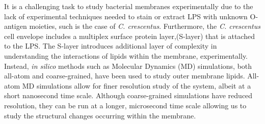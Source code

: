 \documentclass[10pt, letterpaper]{article}
\begin{document}
\par It is a challenging task to study bacterial membranes experimentally due to the lack of experimental techniques needed to stain or extract LPS with unknown O-antigen moieties, such is the case of \textit{C. crescentus}. Furthermore, the \textit{C. crescentus} cell envelope includes a multiplex surface protein layer,(S-layer) that is attached to the LPS. The S-layer introduces additional layer of complexity in understanding the interactions of lipids within the membrane, experimentally. Instead, \textit{in silico} methods such as  Molecular Dynamics (MD) simulations, both all-atom and coarse-grained, have been used to study outer membrane lipids. All-atom MD simulations allow for finer resolution study of the system, albeit at a short nanosecond time scale. Although coarse-grained simulations have reduced resolution, they can be run at a longer, microsecond time scale allowing us to study the structural changes occurring within the membrane.
\end{document}
